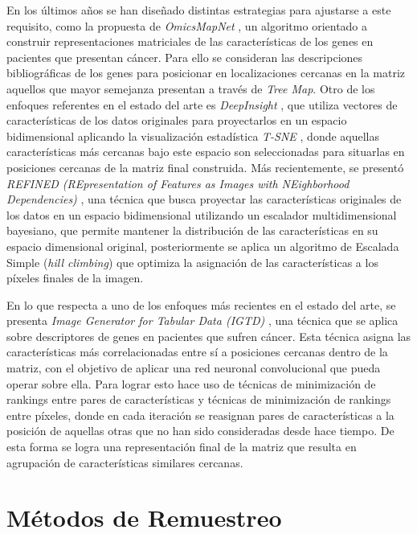 \documentclass{uathesis-es}
\begin{document}
	En los últimos años se han diseñado distintas estrategias para ajustarse a este requisito, como la propuesta de \textit{OmicsMapNet} \cite{ma2019omicsmapnet}, un algoritmo orientado a construir representaciones matriciales de las características de los genes en pacientes que presentan cáncer. Para ello se consideran las descripciones bibliográficas de los genes para posicionar en localizaciones cercanas en la matriz aquellos que mayor semejanza presentan a través de \textit{Tree Map}. Otro de los enfoques referentes en el estado del arte es \textit{DeepInsight} \cite{Sharma2019}, que utiliza vectores de características de los datos originales para proyectarlos en un espacio bidimensional aplicando la visualización estadística \textit{T-SNE} \cite{van2008visualizing}, donde aquellas características más cercanas bajo este espacio son seleccionadas para situarlas en posiciones cercanas de la matriz final construida. Más recientemente, se presentó \textit{REFINED (REpresentation of Features as Images with NEighborhood Dependencies)} \cite{Bazgir2020}, una técnica que busca proyectar las características originales de los datos en un espacio bidimensional utilizando un escalador multidimensional bayesiano, que permite mantener la distribución de las características en su espacio dimensional original, posteriormente se aplica un algoritmo de Escalada Simple (\textit{hill climbing}) que optimiza la asignación de las características a los píxeles finales de la imagen.
	
	En lo que respecta a uno de los enfoques más recientes en el estado del arte, se presenta \textit{Image Generator for Tabular Data (IGTD)} \cite{Zhu2021}, una técnica que se aplica sobre descriptores de genes en pacientes que sufren cáncer. Esta técnica asigna las características más correlacionadas entre sí a posiciones cercanas dentro de la matriz, con el objetivo de aplicar una red neuronal convolucional que pueda operar sobre ella. Para lograr esto hace uso de técnicas de minimización de rankings entre pares de características y técnicas de minimización de rankings entre píxeles, donde en cada iteración se reasignan pares de características a la posición de aquellas otras que no han sido consideradas desde hace tiempo. De esta forma se logra una representación final de la matriz que resulta en agrupación de características similares cercanas.
	
	\section{Métodos de Remuestreo}
	\label{SOAT_RESAMPLING}
	
\end{document}

